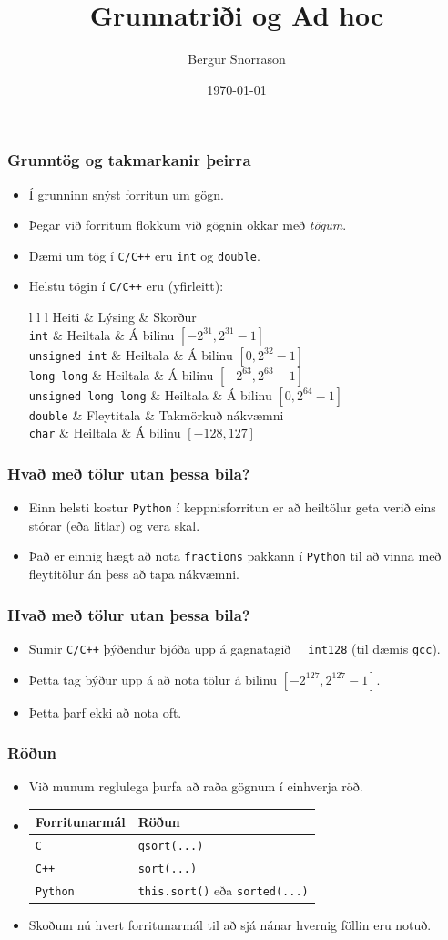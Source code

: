 \documentclass[handout]{beamer}
\title{Grunnatriði og Ad hoc}
\author{Bergur Snorrason}
\date{\today}
\newcommand\env[2]
{
	\begin{#1}
	#2
	\end{#1}
}
\newcommand\code[1]{\tiny}
\begin{document}
\frame{\titlepage}

\env{frame}
{
	\frametitle{Grunntög og takmarkanir þeirra}
	\env{itemize}
	{
		\item<1-> Í grunninn snýst forritun um gögn.
		\item<2-> Þegar við forritum flokkum við gögnin okkar með \emph{tögum}.
		\item<3-> Dæmi um tög í \texttt{C/C++} eru \texttt{int} og \texttt{double}.
		\item<4-> Helstu tögin í \texttt{C/C++} eru (yfirleitt):
		\env{tabular}
		{
			{l l l}
			Heiti & Lýsing & Skorður\\
			\texttt{int} & Heiltala & Á bilinu $[-2^{31}, 2^{31} - 1]$\\
			\texttt{unsigned int} & Heiltala & Á bilinu $[0, 2^{32} - 1]$\\
			\texttt{long long} & Heiltala & Á bilinu $[-2^{63}, 2^{63} - 1]$\\
			\texttt{unsigned long long} & Heiltala & Á bilinu $[0, 2^{64} - 1]$\\
			\texttt{double} & Fleytitala & Takmörkuð nákvæmni\\
			\texttt{char} & Heiltala & Á bilinu $[-128, 127]$\\
		}
	}
}

\env{frame}
{
	\frametitle{Hvað með tölur utan þessa bila?}
	\env{itemize}
	{
		\item<1-> Einn helsti kostur \texttt{Python} í keppnisforritun er að heiltölur geta verið eins stórar (eða litlar) og vera skal.
		\pause \code{fact.py}
		\pause \code{fact.out}
		\item<4-> Það er einnig hægt að nota \texttt{fractions} pakkann í \texttt{Python} til að vinna með fleytitölur án þess að tapa nákvæmni.
	}
}

\env{frame}
{
	\frametitle{Hvað með tölur utan þessa bila?}
	\env{itemize}
	{
		\item<1-> Sumir \texttt{C/C++} þýðendur bjóða upp á gagnatagið \texttt{\_\_int128} (til dæmis \texttt{gcc}).
		\item<2-> Þetta tag býður upp á að nota tölur á bilinu $[-2^{127}, 2^{127} - 1]$.
		\item<3-> Þetta þarf ekki að nota oft.
	}
}

\env{frame}
{
	\frametitle{Röðun}
	\env{itemize}
	{
		\item<1-> Við munum reglulega þurfa að raða gögnum í einhverja röð.
		\item<2-> 
		\pause
		\begin{tabular}{l l}
			Forritunarmál & Röðun\\
			\hline
			\texttt{C} & \texttt{qsort(...)}\\
			\texttt{C++} & \texttt{sort(...)}\\
			\texttt{Python} & \texttt{this.sort()} eða \texttt{sorted(...)}\\
		\end{tabular}
		\item<3-> Skoðum nú hvert forritunarmál til að sjá nánar hvernig föllin eru notuð.
	}
}
\end{document}
